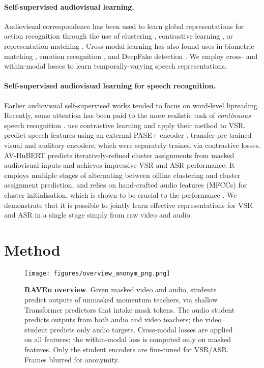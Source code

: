 \documentclass{article} \usepackage{iclr2023_conference,times}
\begin{document}
\paragraph{Self-supervised audiovisual learning.} Audiovisual correspondence has been used to learn global representations for action recognition through the use of clustering \citep{alwassel2020self, asano2020labelling}, contrastive learning \citep{arandjelovic2017look, arandjelovic2018objects, korbar2018cooperative, patrick2020multi, morgado2021audio, ma2021contrastive}, or representation matching \citep{recasens2021broaden}. Cross-modal learning has also found uses in biometric matching \citep{nagrani2018learnable, nagrani2018seeing}, emotion recognition \citep{shukla2021does}, and DeepFake detection \citep{haliassos2022leveraging}. We employ cross- and within-modal losses to learn temporally-varying speech representations.

\paragraph{Self-supervised audiovisual learning for speech recognition.} Earlier audiovisual self-supervised works \citep{chung2016out, chung2019perfect, chung2020seeing} tended to focus on word-level lipreading. Recently, some attention has been paid to the more realistic task of \textit{continuous} speech recognition \citep{ma2021lira, shi2022learning, sheng2021cross, pan2022leveraging, ma2021contrastive}. \citet{sheng2021cross, ma2021contrastive} use contrastive learning and apply their method to VSR. \citet{ma2021lira} predict speech features using an external PASE+ encoder \citep{ravanelli2020multi}. \citet{pan2022leveraging} transfer pre-trained visual and auditory encoders, which were separately trained via contrastive losses. AV-HuBERT \citep{shi2022learning} predicts iteratively-refined cluster assignments from masked audiovisual inputs and achieves impressive VSR and ASR performance. It employs multiple stages of alternating between offline clustering and cluster assignment prediction, and relies on hand-crafted audio features (MFCCs) for cluster initialisation, which is shown to be crucial to the performance \citep{shi2022learning}. We demonstrate that it is possible to jointly learn effective representations for VSR and ASR in a single stage simply from raw video and audio.

\section{Method}
\begin{figure}
  \centering
  \texttt{[image: figures/overview\_anonym\_png.png]}
  \caption{\textbf{RAVEn overview}. Given masked video and audio, students predict outputs of unmasked momentum teachers, via shallow Transformer predictors that intake mask tokens. The audio student predicts outputs from both audio and video teachers; the video student predicts only audio targets. Cross-modal losses are applied on all features; the within-modal loss is computed only on masked features. Only the student encoders are fine-tuned for VSR/ASR. Frames blurred for anonymity.}
  \label{fig:overview}
\end{figure}
\end{document}
